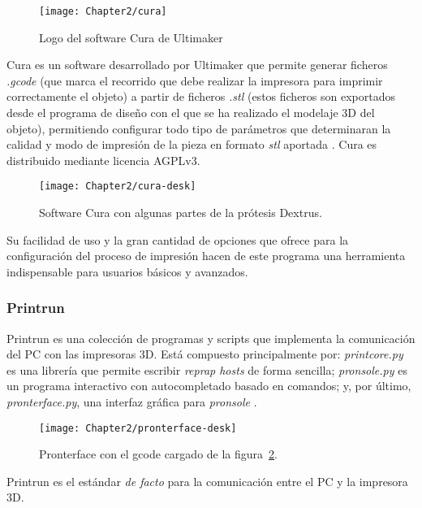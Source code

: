\begin{figure}[htp]
  \centering
    \texttt{[image: Chapter2/cura]}
  \caption{Logo del software Cura de Ultimaker}
\label{fig:cura}
\end{figure}


Cura es un software desarrollado por Ultimaker que permite generar ficheros
\textit{.gcode} (que marca el recorrido que debe realizar la impresora para imprimir correctamente el objeto) a partir de ficheros \textit{.stl} (estos ficheros son exportados desde el programa de diseño con el que se ha realizado el modelaje 3D del objeto), permitiendo configurar todo tipo de parámetros que determinaran la calidad y modo de impresión de la pieza en formato \textit{stl} aportada \cite{Cura}. Cura es distribuido mediante
licencia AGPLv3.



\begin{figure}[htp]
  \centering
    \texttt{[image: Chapter2/cura-desk]}
  \caption{Software Cura con algunas partes de la prótesis Dextrus.}
\label{fig:cura-desk}
\end{figure}

Su facilidad de uso y la gran cantidad de opciones que ofrece para la configuración
del proceso de impresión hacen de este programa una herramienta indispensable para
usuarios básicos y avanzados.



\subsubsection{Printrun}
\label{subs:printrun}

Printrun es una colección de programas y scripts que implementa la comunicación
del PC con las impresoras 3D. Está compuesto principalmente por: \textit{printcore.py}
es una librería que permite escribir \textit{reprap hosts}  de forma sencilla;
\textit{pronsole.py} es un programa interactivo con autocompletado basado en comandos;
y, por último, \textit{pronterface.py}, una interfaz gráfica para \textit{pronsole}
\cite{printrun}.

\begin{figure}[htp]
  \centering
    \texttt{[image: Chapter2/pronterface-desk]}
  \caption{Pronterface con el gcode cargado de la figura~\ref{fig:cura-desk}.}
\label{fig:pronterface-desk}
\end{figure}

Printrun es el estándar \textit{de facto} para la comunicación entre el PC y la
impresora 3D.



